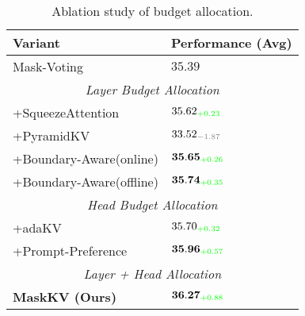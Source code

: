\begin{table}[t]
\centering
\small
\renewcommand{\arraystretch}{1.15}
\setlength{\tabcolsep}{10pt}
\begin{tabular}{l l}
\toprule
\textbf{Variant} & \textbf{Performance (Avg) } \\
\midrule
Mask-Voting  & $35.39$ \\
\midrule
\multicolumn{2}{c}{\textit{Layer Budget Allocation}} \\
\midrule
+SqueezeAttention          & $35.62_{\textcolor{green}{\scriptsize +0.23}}$ \\
+PyramidKV          & $33.52_{\textcolor{black!50}{\scriptsize -1.87}}$ \\
\rowcolor{lightgreen}
+Boundary-Aware(online)  & $\mathbf{35.65}_{\textcolor{green}{\scriptsize +0.26}}$ \\
\rowcolor{lightgreen}
+Boundary-Aware(offline)  & $\mathbf{35.74}_{\textcolor{green}{\scriptsize +0.35}}$ \\
\midrule
\multicolumn{2}{c}{\textit{Head Budget Allocation}} \\
\midrule
+adaKV         & $35.70_{\textcolor{green}{\scriptsize +0.32}}$ \\
\rowcolor{lightgreen}
+Prompt-Preference    & $\mathbf{35.96}_{\textcolor{green}{\scriptsize +0.57}}$ \\
\midrule
\multicolumn{2}{c}{\textit{Layer + Head Allocation}} \\
\midrule
\rowcolor{lightgreen}
\textbf{MaskKV (Ours) } & $\mathbf{36.27}_{\textcolor{green}{\scriptsize +0.88}}$ \\
\bottomrule
\end{tabular}
\caption{Ablation study of budget allocation.}
\label{tab:ablation}
\end{table}

